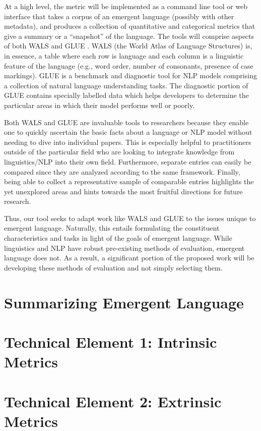 At a high level, the metric will be implemented as a command line tool or web interface that takes a corpus of an emergent language (possibly with other metadata), and produces a collection of quantitative and categorical metrics that give a summary or a ``snapshot'' of the language.
The tools will comprise aspects of both WALS \citep{wals} and GLUE \citep{wang2018glue}.
WALS (the World Atlas of Language Structures) \citep{wals} is, in essence, a table where each row is language and each column is a linguistic feature of the language (e.g., word order, number of consonants, presence of case markings).
GLUE \citep{wang2018glue} is a benchmark and diagnostic tool for NLP models comprising a collection of natural language understanding tasks.
The diagnostic portion of GLUE contains specially labelled data which helps developers to determine the particular areas in which their model performs well or poorly.

Both WALS and GLUE are invaluable tools to researchers because they enable one to quickly ascertain the basic facts about a language or NLP model without needing to dive into individual papers.
This is especially helpful to practitioners outside of the particular field who are looking to integrate knowledge from linguistics/NLP into their own field.
Furthermore, separate entries can easily be compared since they are analyzed according to the same framework.
Finally, being able to collect a representative sample of comparable entries highlights the yet unexplored areas  and hints towards the most fruitful directions for future research.

Thus, our tool seeks to adapt work like WALS and GLUE to the issues unique to emergent language.
Naturally, this entails formulating the constituent characteristics and tasks in light of the goals of emergent language.
While linguistics and NLP have robust pre-existing methods of evaluation, emergent language does not.
As a result, a significant portion of the proposed work will be developing these methods of evaluation and not simply selecting them.





\section{Summarizing Emergent Language}

\section{Technical Element 1: Intrinsic Metrics}
\section{Technical Element 2: Extrinsic Metrics}
